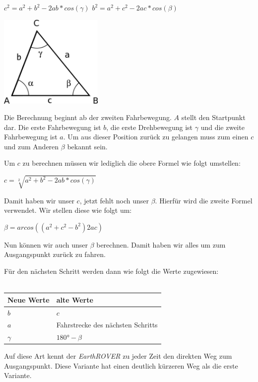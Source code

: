 \begin{capdefinition}	
	$c^2 = a^2 + b^2 - 2ab*cos(\gamma)$
	$b^2 = a^2 + c^2 - 2ac*cos(\beta)$
\end{capdefinition}

\begin{capfigure}[Kosinussatz]
	\includegraphics[width=5cm]{images/implementation/cosinus}
\end{capfigure}

Die Berechnung beginnt ab der zweiten Fahrbewegung. $A$ stellt den Startpunkt dar. Die erste Fahrbewegung ist $b$, die erste Drehbewegung ist $\gamma$ und die zweite Fahrbewegung ist $a$. Um aus dieser Position zurück zu gelangen muss zum einen $c$ und zum Anderen $\beta$ bekannt sein.

Um $c$ zu berechnen müssen wir lediglich die obere Formel wie folgt umstellen:

$c = \sqrt[2]{a^2 + b^2 - 2ab*cos(\gamma)}$

Damit haben wir unser $c$, jetzt fehlt noch unser $\beta$. Hierfür wird die zweite Formel verwendet. Wir stellen diese wie folgt um:

$\beta = arcos((a^2 + c^2 - b^2)2ac)$

Nun können wir auch unser $\beta$ berechnen. Damit haben wir alles um zum Ausgangspunkt zurück zu fahren.

Für den nächsten Schritt werden dann wie folgt die Werte zugewiesen:\\
\\
\begin{tabular}[htbp]{|l|l|}
	\hline
	Neue Werte & alte Werte \\
	\hline
	$b$ & $c$ \\
	\hline
	$a$ & Fahrstrecke des nächsten Schritts \\
	\hline
	$\gamma$ & $180° - \beta$\\
	\hline
\end{tabular}

Auf diese Art kennt der \textit{EarthROVER} zu jeder Zeit den direkten Weg zum Ausgangspunkt. Diese Variante hat einen deutlich kürzeren Weg als die erste Variante.


